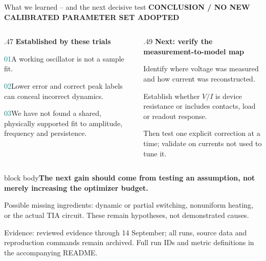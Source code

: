 \documentclass[aspectratio=169,11pt]{beamer}
\newcommand{\eyebrow}[1]{{\color{teal}\scriptsize\bfseries\MakeUppercase{#1}}\par\vspace{2mm}}
\newcommand{\takeaway}[1]{\par\vspace{2mm}\begin{beamercolorbox}[sep=2mm,wd=\linewidth]{block body}\small\bfseries #1\end{beamercolorbox}}
\newcommand{\src}[1]{\par\vfill{\fontsize{6.5}{8}\selectfont\color{muted}Evidence: #1. Full run IDs and metric definitions in the accompanying README.\par}}
\begin{document}
\begin{frame}[t]{What we learned -- and the next decisive test}
\eyebrow{Conclusion / No new calibrated parameter set adopted}
\begin{columns}[T,onlytextwidth]
\begin{column}{.47\textwidth}
\textbf{Established by these trials}\par\vspace{3mm}
\small
\textcolor{teal}{01}\quad A working oscillator is not a sample fit.\par\vspace{3mm}
\textcolor{teal}{02}\quad Lower error and correct peak labels can conceal incorrect dynamics.\par\vspace{3mm}
\textcolor{teal}{03}\quad We have not found a shared, physically supported fit to amplitude, frequency and persistence.
\end{column}
\begin{column}{.49\textwidth}
\textbf{Next: verify the measurement-to-model map}\par\vspace{3mm}
\small Identify where voltage was measured and how current was reconstructed.\par\vspace{3mm}
Establish whether $V/I$ is device resistance or includes contacts, load or readout response.\par\vspace{3mm}
Then test one explicit correction at a time; validate on currents not used to tune it.
\end{column}
\end{columns}
\vspace{3mm}
\takeaway{The next gain should come from testing an assumption, not merely increasing the optimizer budget.}
\vspace{2mm}
\small\color{muted}Possible missing ingredients: dynamic or partial switching, nonuniform heating, or the actual TIA circuit. These remain hypotheses, not demonstrated causes.
\src{reviewed evidence through 14 September; all runs, source data and reproduction commands remain archived}
\end{frame}
\end{document}

